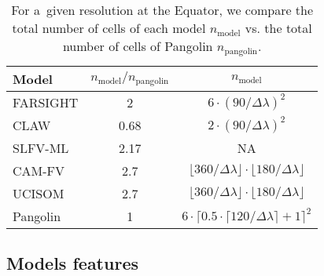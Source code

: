 \begin{table}[t]
  \centering
  \caption{For a~given resolution at the Equator, we compare the total number of
    cells of each model $n_{\text{model}}$ vs. the total number of cells of Pangolin
    $n_{\text{pangolin}}$.  }
\label{table:models_cells}
{\begin{tabular}{lcc}
    \toprule
    Model & $n_{\text{model}}/n_{\text{pangolin}}$ & $n_{\text{model}}$\\
    \midrule
    FARSIGHT    & 2     & $6\cdot (90/\Delta\lambda)^2$ \\
    CLAW        & 0.68  & $2\cdot (90/\Delta\lambda)^2$ \\
    SLFV-ML     & 2.17  & NA \\
    CAM-FV      & 2.7   & $\lfloor{360/\Delta\lambda}\rfloor\cdot\lfloor{180/\Delta\lambda}\rfloor$ \\
    UCISOM      & 2.7   & $\lfloor{360/\Delta\lambda}\rfloor\cdot\lfloor{180/\Delta\lambda}\rfloor$ \\
    Pangolin    & 1   & $6\cdot{\lceil{0.5\cdot\lceil120/\Delta\lambda\rceil+1}\rceil}^2$ \\
    \bottomrule
  \end{tabular}}
\end{table}




   \subsection{Models features}

